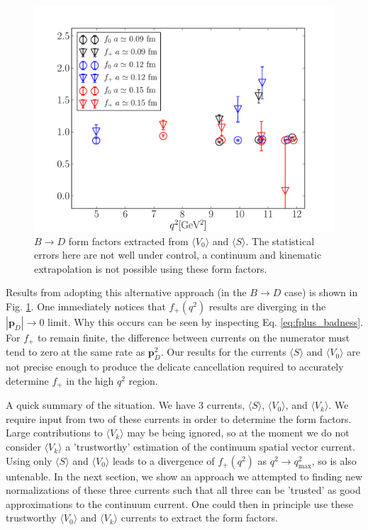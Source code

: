 \begin{figure}[htb!]
  \begin{center}
        \includegraphics[width=1.0\textwidth]{images/nrqcd/BD_formfactors_fromV0S.pdf}
  \end{center}
  \caption{$B\to D$ form factors extracted from $\langle V_0 \rangle$ and $\langle S \rangle$. The statistical errors here are not well under control, a continuum and kinematic extrapolation is not possible using these form factors.\label{fig:f0fp_fromV0S}}
\end{figure}

Results from adopting this alternative approach (in the $B\to D$ case) is shown in Fig. \ref{fig:f0fp_fromV0S}. One immediately notices that $f_+(q^2)$ results are diverging in the $|{\textbf{p}}_{D}| \to 0$ limit. Why this occurs can be seen by inspecting Eq. \eqref{eq:fplus_badness}. For $f_+$ to remain finite, the difference between currents on the numerator must tend to zero at the same rate as ${\textbf{p}}_D^2$. Our results for the currents $\langle S \rangle$ and $\langle V_0 \rangle$ are not precise enough to produce the delicate cancellation required to accurately determine $f_+$ in the high $q^2$ region.

A quick summary of the situation. We have 3 currents, $\langle S \rangle$, $\langle V_0 \rangle$, and $\langle V_k \rangle$. We require input from two of these currents in order to determine the form factors. Large contributions to $\langle V_k \rangle$ may be being ignored, so at the moment we do not consider $\langle V_k \rangle$ a 'trustworthy' estimation of the continuum spatial vector current. Using only $\langle S \rangle$ and $\langle V_0 \rangle$ leads to a divergence of $f_+(q^2)$ as $q^2\to q^2_{\text{max}}$, so is also untenable. In the next section, we show an approach we attempted to finding new normalizations of these three currents such that all three can be 'trusted' as good approximations to the continuum current. One could then in principle use these trustworthy $\langle V_0 \rangle$ and $\langle V_k \rangle$ currents to extract the form factors.

